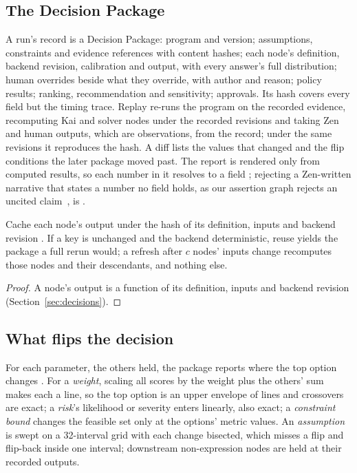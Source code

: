 \subsection{The Decision Package}

A run's record is a Decision Package: program and version; assumptions,
constraints and evidence references with content hashes; each node's
definition, backend revision, calibration and output, with every answer's full
distribution; human overrides beside what they override, with author and
reason; policy results; ranking, recommendation and sensitivity; approvals. Its
hash covers every field but the timing trace. Replay re-runs the program on
the recorded evidence, recomputing Kai and solver nodes under the recorded
revisions and taking Zen and human outputs, which are observations, from the
record; under the same revisions it reproduces the hash. A diff lists the
values that changed and the flip conditions the later package moved past. The
report is rendered only from computed results, so each number in it resolves
to a field \shipped; rejecting a Zen-written narrative that states a number no
field holds, as our assertion graph rejects an uncited
claim~\cite{hanzographpaper}, is \proposed.

\begin{proposition}
\label{prop:refresh}
Cache each node's output under the hash of its definition, inputs and backend
revision \shipped. If a key is unchanged and the backend deterministic, reuse yields the
package a full rerun would; a refresh after $c$ nodes' inputs change recomputes
those nodes and their descendants, and nothing else.
\end{proposition}
\begin{proof}
A node's output is a function of its definition, inputs and backend revision
(Section~\ref{sec:decisions}).
\end{proof}

\subsection{What flips the decision}
\label{sec:flip}

For each parameter, the others held, the package reports where the top option
changes \shipped. For a \emph{weight}, scaling all scores by the weight plus
the others' sum makes each a line, so the top option is an upper envelope of
lines and crossovers are exact; a \emph{risk}'s likelihood or severity enters
linearly, also exact; a \emph{constraint bound} changes the feasible set only
at the options' metric values. An \emph{assumption} is swept on a 32-interval
grid with each change bisected, which misses a flip and flip-back inside one
interval; downstream non-expression nodes are held at their recorded outputs.

